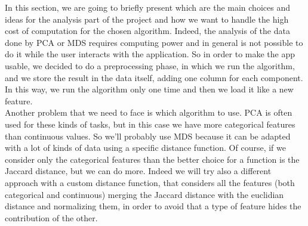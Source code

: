 \documentclass[a4paper, 11pt]{article}
\begin{document}
In this section, we are going to briefly present which are the main choices and ideas for the analysis part of the project and how we want to handle the high cost of computation for the chosen algorithm.   
Indeed, the analysis of the data done by PCA or MDS requires computing power and in general is not possible to do it while the user interacts with the application. 
So in order to make the app usable, we decided to do a preprocessing phase, in which we run the algorithm, and we store the result in the data itself, adding one column for each component. In this way, we run the algorithm only one time and then we load it like a new feature. \\

Another problem that we need to face is which algorithm to use. PCA is often used for these kinds of tasks, but in this case we have more categorical features than continuous values. So we'll probably use MDS because it can be adapted with a lot of kinds of data using a specific distance function. Of course, if we consider only the categorical features than the better choice for a function is the Jaccard distance, but we can do more. Indeed we will try also a different approach with a custom distance function, that considers all the features (both categorical and continuous) merging the Jaccard distance with the euclidian distance and normalizing them, in order to avoid that a type of feature hides the contribution of the other.
\end{document}
